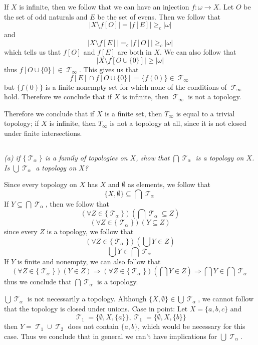 \documentclass[11pt,oneside,titlepage]{book}
\DeclareMathOperator \topol {\mathcal {T}}
\DeclareMathOperator \ra {\Rightarrow}
\newcommand{\set}[1]{\{ #1 \}}
\begin{document}
If $X$ is infinite, then we follow that we can have an injection $f: \omega \to X$.
Let $O$ be the set of odd naturals and $E$ be the set of evens. Then we follow that
$$|X \setminus f[O]| = |f[E]| \geq_c |\omega|$$
and
$$|X \setminus f[E]| =_c |f[O]| \geq_c |\omega|$$
which tells us that $f[O]$ and $f[E]$ are both in $X$. We can also follow that
$$|X \setminus f[O \cup \{0\}]| \geq |\omega|$$
thus $ f[O \cup \{0\}] \in \topol_\infty$. This gives us that
$$f[E] \cap f[O \cup \{0\}] = \{f(0)\} \in \topol_\infty$$
but $\{f(0)\}$ is a finite nonempty set for which none of the conditions of $\topol_\infty$
hold. Therefore we conclude that if $X$ is infinite, then $\topol_\infty$ is not a topology.

Therefore we conclude that if $X$ is a finite set, then $T_\infty$ is equal to a
trivial topology; if $X$ is infinite, then $T_\infty$ is not a topology at all, since
it is not closed under finite intersections.

\subsection{}

\textit{(a) if $\{\topol_\alpha\}$ is a family of topologies on $X$, show that
  $\bigcap{\topol_\alpha}$ is a topology on $X$. Is $\bigcup{\topol_\alpha}$ a topology on $X$?}

Since every topology on $X$ has $X$ and $\emptyset$ as elements, we follow that
$$\{X, \emptyset\} \subseteq \bigcap{\topol_\alpha}$$
If $Y \subseteq \bigcap{\topol_\alpha}$, then we follow that
$$(\forall Z \in \{\topol_\alpha\})(\bigcap{\topol_\alpha} \subseteq Z)$$
$$(\forall Z \in \{\topol_\alpha\})(Y \subseteq Z)$$
since every $Z$ is a topology, we follow that
$$(\forall Z \in \{\topol_\alpha\})(\bigcup{Y} \in Z)$$
$$\bigcup{Y} \in \bigcap{\topol_\alpha}$$
If $Y$ is finite and nonempty, we can also follow that
$$(\forall Z \in \{\topol_\alpha\})(Y \in Z) \ra
(\forall Z \in \{\topol_\alpha\})(\bigcap{Y} \in Z) \ra \bigcap{Y} \in \bigcap{\topol_\alpha}$$
thus we conclude that $\bigcap{\topol_\alpha}$ is a topology.

$\bigcup{\topol_\alpha}$ is not necessarily a topology. Although
$\set{X, \emptyset} \in \bigcup{\topol_\alpha}$, we cannot follow that the topology is
closed under unions. Case in point: Let $X = \set{a, b, c}$ and
$$\topol_1 = \set{\emptyset, X, \set{a}}, \topol_1 = \set{\emptyset, X, \set{b}}$$
then $Y = \topol_1 \cup \topol_2$ does not contain $\set{a, b}$, which would be necessary
for this case. Thus we conclude that in general we can't have implications for
$\bigcup{\topol_\alpha}$.
\end{document}
